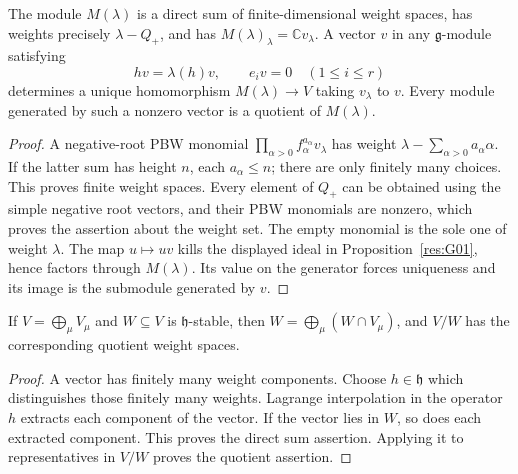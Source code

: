 \begin{proposition}
\label{res:G02}
The module \(M(\lambda)\) is a direct sum of finite-dimensional weight
spaces, has weights precisely \(\lambda-Q_+\), and has
\(M(\lambda)_\lambda=\mathbb C v_\lambda\). A vector \(v\) in any
\(\mathfrak g\)-module satisfying
\[
 hv=\lambda(h)v,\qquad e_iv=0\quad(1\leq i\leq r)
\]
determines a unique homomorphism \(M(\lambda)\to V\) taking
\(v_\lambda\) to \(v\). Every module generated by such a nonzero
vector is a quotient of \(M(\lambda)\).
\end{proposition}
\begin{proof}
A negative-root PBW monomial
\(\prod_{\alpha>0}f_\alpha^{a_\alpha}v_\lambda\) has weight
\(\lambda-\sum_{\alpha>0}a_\alpha\alpha\).
If the latter sum has height \(n\), each \(a_\alpha\leq n\);
there are only finitely many choices. This proves finite weight
spaces. Every element of \(Q_+\) can be obtained using the simple
negative root vectors, and their PBW monomials are nonzero, which
proves the assertion about the weight set. The empty monomial is
the sole one of weight \(\lambda\).
The map \(u\mapsto uv\) kills the displayed ideal in
Proposition~\ref{res:G01}, hence factors through \(M(\lambda)\).
Its value on the generator forces uniqueness and its image is
the submodule generated by \(v\).
\end{proof}

\begin{lemma}
\label{supp:weight-submodules}
If \(V=\bigoplus_\mu V_\mu\) and \(W\subseteq V\) is
\(\mathfrak h\)-stable, then
\(W=\bigoplus_\mu(W\cap V_\mu)\), and \(V/W\) has the corresponding
quotient weight spaces.
\end{lemma}
\begin{proof}
A vector has finitely many weight components. Choose \(h\in\mathfrak h\)
which distinguishes those finitely many weights. Lagrange interpolation
in the operator \(h\) extracts each component of the vector. If the
vector lies in \(W\), so does each extracted component. This proves
the direct sum assertion. Applying it to representatives in \(V/W\)
proves the quotient assertion.
\end{proof}


